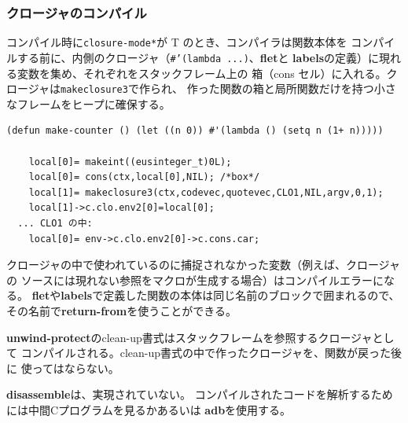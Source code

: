 \subsubsection{クロージャのコンパイル}

コンパイル時に{\tt *closure-mode*}が T のとき、コンパイラは関数本体を
コンパイルする前に、内側のクロージャ（{\tt \#'(lambda ...)}、{\bf flet}と
{\bf labels}の定義）に現れる変数を集め、それぞれをスタックフレーム上の
箱（cons セル）に入れる。クロージャは{\tt makeclosure3}で作られ、
作った関数の箱と局所関数だけを持つ小さなフレームをヒープに確保する。
\begin{verbatim}
(defun make-counter () (let ((n 0)) #'(lambda () (setq n (1+ n)))))

	local[0]= makeint((eusinteger_t)0L);
	local[0]= cons(ctx,local[0],NIL); /*box*/
	local[1]= makeclosure3(ctx,codevec,quotevec,CLO1,NIL,argv,0,1);
	local[1]->c.clo.env2[0]=local[0];
  ... CLO1 の中:
	local[0]= env->c.clo.env2[0]->c.cons.car;
\end{verbatim}
クロージャの中で使われているのに捕捉されなかった変数（例えば、クロージャの
ソースには現れない参照をマクロが生成する場合）はコンパイルエラーになる。
{\bf flet}や{\bf labels}で定義した関数の本体は同じ名前のブロックで囲まれるので、
その名前で{\bf return-from}を使うことができる。

{\bf unwind-protect}のclean-up書式はスタックフレームを参照するクロージャとして
コンパイルされる。clean-up書式の中で作ったクロージャを、関数が戻った後に
使ってはならない。

{\bf disassemble}は、実現されていない。
コンパイルされたコードを解析するためには中間Cプログラムを見るかあるいは
{\bf adb}を使用する。

